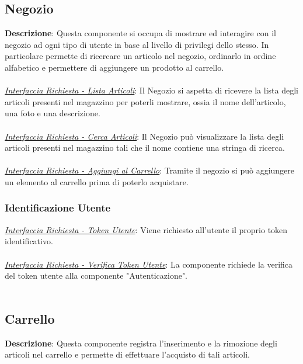 \documentclass{report}
\begin{document}

\subsection*{Negozio}
\textbf{Descrizione}: Questa componente si occupa di mostrare  ed interagire con il negozio ad ogni tipo di utente in base al livello di privilegi dello stesso. In particolare permette di ricercare un articolo nel negozio, ordinarlo in ordine alfabetico e permettere di aggiungere un prodotto al carrello.\\\\
\uline{\textit{Interfaccia Richiesta - Lista Articoli}}: 
Il Negozio si aspetta di ricevere la lista degli articoli presenti nel magazzino per poterli mostrare, ossia il nome dell'articolo, una foto e una descrizione. \\ \\
\uline{\textit{Interfaccia Richiesta - Cerca Articoli}}: 
Il Negozio può visualizzare la lista degli articoli presenti nel magazzino tali che il nome contiene una stringa di ricerca.\\\\
\uline{\textit{Interfaccia Richiesta - Aggiungi al Carrello}}: 
Tramite il negozio si può aggiungere un elemento al carrello prima di poterlo acquistare. 
\subsubsection*{\indent \indent Identificazione Utente}
\uline{\textit{Interfaccia Richiesta - Token Utente}}: 
Viene richiesto all'utente il proprio token identificativo.\\ \\
\uline{\textit{Interfaccia Richiesta - Verifica Token Utente}}: 
La componente richiede la verifica del token utente alla componente "Autenticazione".\\\\

\subsection*{Carrello}
\textbf{Descrizione}: Questa componente registra l'inserimento e la rimozione degli articoli nel carrello e permette di effettuare l'acquisto di tali articoli. 
\end{document}
